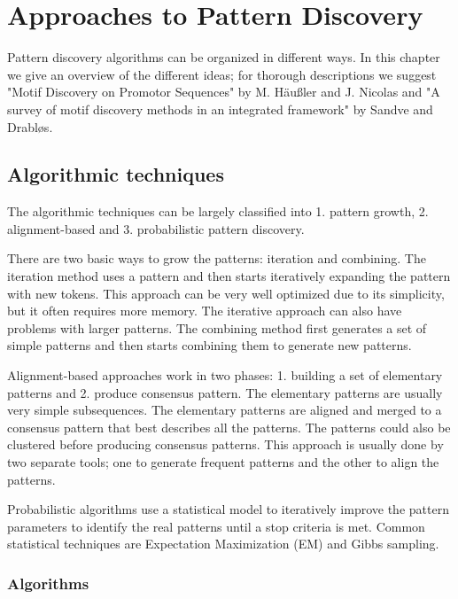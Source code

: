 \chapter{Approaches to Pattern Discovery}
\label{c:algorithms}

Pattern discovery algorithms can be organized in different ways\cite{SurveyDNAMotif, SurveyMotifDiscovery, CombinatorialSubtle, Hausler05}. In this chapter we give an overview of the different ideas; for thorough descriptions we suggest "Motif Discovery on Promotor Sequences" by M. Häußler and J. Nicolas\cite{Hausler05} and "A survey of motif discovery methods in an integrated framework" by Sandve and Drabløs\cite{SurveyMotifDiscovery}.

\section{Algorithmic techniques}

The algorithmic techniques can be largely classified into 1. pattern growth, 2. alignment-based and 3. probabilistic pattern discovery.

There are two basic ways to grow the patterns: iteration and combining. The iteration method uses a pattern and then starts iteratively expanding the pattern with new tokens. This approach can be very well optimized due to its simplicity, but it often requires more memory. The iterative approach can also have problems with larger patterns. The combining method first generates a set of simple patterns and then starts combining them to generate new patterns.

Alignment-based approaches work in two phases: 1. building a set of elementary patterns and 2. produce consensus pattern. The elementary patterns are usually very simple subsequences. The elementary patterns are aligned and merged to a consensus pattern that best describes all the patterns. The patterns could also be clustered before producing consensus patterns. This approach is usually done by two separate tools; one to generate frequent patterns and the other to align the patterns.

Probabilistic algorithms use a statistical model to iteratively improve the pattern parameters to identify the real patterns until a stop criteria is met. Common statistical techniques are Expectation Maximization (EM) and Gibbs sampling.

\subsection{Algorithms}

